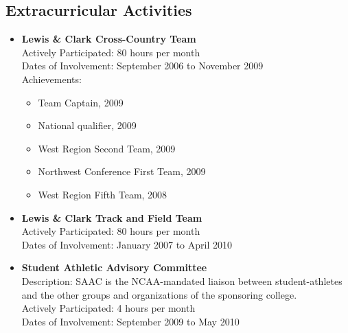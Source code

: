 \documentclass{res}
\begin{document}
\begin{resume}
\section{Extracurricular Activities}          
    \begin{itemize}
 	    \item
            \textbf{Lewis \& Clark Cross-Country Team}\\
            Actively Participated: 80 hours per month\\
            Dates of Involvement: September 2006 to November 2009\\
            Achievements:
            \begin{itemize}
                \item Team Captain, 2009
                \item National qualifier, 2009
                \item West Region Second Team, 2009
                \item Northwest Conference First Team, 2009
                \item West Region Fifth Team, 2008
            \end{itemize}
 	    \item
            \textbf{Lewis \& Clark Track and Field Team}\\
            Actively Participated: 80 hours per month\\
            Dates of Involvement: January 2007 to April 2010
        \item
            \textbf{Student Athletic Advisory Committee}\\
            Description: SAAC is the NCAA-mandated liaison between student-athletes
            and the other groups and organizations of the sponsoring college.\\
            Actively Participated: 4 hours per month\\
            Dates of Involvement: September 2009 to May 2010
    \end{itemize}
 
\end{resume}
\end{document}
